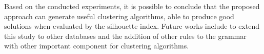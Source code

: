 \documentclass[conference,compsoc]{IEEEtran}
\begin{document}
Based on the conducted experiments, it is possible to conclude that the proposed approach can generate useful clustering algorithms, able to produce good solutions when evaluated by the silhouette index. Future works include to extend this study to other databases and the addition of other rules to the grammar with other important component for clustering algorithms.








\end{document}
